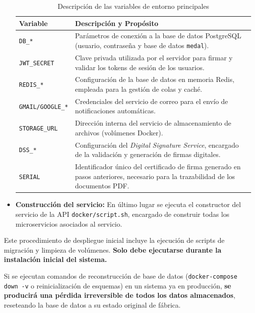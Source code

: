 \documentclass[12pt,a4paper]{report}
\begin{document}
\begin{itemize}
    \begin{table}[htbp]
        \centering
        \caption{Descripción de las variables de entorno principales}
        \label{tab:variables_entorno}
        \begin{tabularx}{\textwidth}{@{} l X @{}}
            \toprule
            \textbf{Variable} & \textbf{Descripción y Propósito} \\
            \midrule
            \texttt{DB\_*} & Parámetros de conexión a la base de datos PostgreSQL (usuario, contraseña y base de datos \texttt{medal}). \\
            \texttt{JWT\_SECRET} & Clave privada utilizada por el servidor para firmar y validar los tokens de sesión de los usuarios. \\
            \texttt{REDIS\_*} & Configuración de la base de datos en memoria Redis, empleada para la gestión de colas y caché. \\
            \texttt{GMAIL/GOOGLE\_*} & Credenciales del servicio de correo para el envío de notificaciones automáticas. \\
            \texttt{STORAGE\_URL} & Dirección interna del servicio de almacenamiento de archivos (volúmenes Docker). \\
            \texttt{DSS\_*} & Configuración del \textit{Digital Signature Service}, encargado de la validación y generación de firmas digitales. \\
            \texttt{SERIAL} & Identificador único del certificado de firma generado en pasos anteriores, necesario para la trazabilidad de los documentos PDF. \\
            \bottomrule
        \end{tabularx}
    \end{table}

\item \textbf{Construcción del servicio:} En último lugar se ejecuta el constructor del servicio de la API \texttt{docker/script.sh}, encargado de construir todas los microservicios asociados al servicio. 
\end{itemize}

\begin{tcolorbox}[
    colback=red!5!white,
    colframe=red!75!black,
    title=\textbf{⚠️ ADVERTENCIA CRÍTICA: Inicialización del Sistema},
    arc=2mm,
    boxrule=0.5mm
]
    Este procedimiento de despliegue inicial incluye la ejecución de scripts de migración y limpieza de volúmenes. \textbf{Solo debe ejecutarse durante la instalación inicial del sistema.} 
    
    Si se ejecutan comandos de reconstrucción de base de datos (\texttt{docker-compose down -v} o reinicialización de esquemas) en un sistema ya en producción, \textbf{se producirá una pérdida irreversible de todos los datos almacenados}, reseteando la base de datos a su estado original de fábrica.
\end{tcolorbox}
\end{document}

